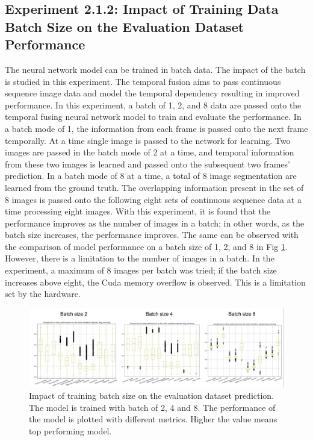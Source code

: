 	\subsection{Experiment 2.1.2: Impact of Training Data Batch Size on the Evaluation Dataset Performance}
	
	The neural network model can be trained in batch data. The impact of the batch is studied in this experiment. The temporal fusion aims to pass continuous sequence image data and model the temporal dependency resulting in improved performance. In this experiment, a batch of 1, 2, and 8 data are passed onto the temporal fusing neural network model to train and evaluate the performance. In a batch mode of 1, the information from each frame is passed onto the next frame temporally. At a time single image is passed to the network for learning. Two images are passed in the batch mode of 2 at a time, and temporal information from these two images is learned and passed onto the subsequent two frames' prediction. In a batch mode of 8 at a time, a total of 8 image segmentation are learned from the ground truth. The overlapping information present in the set of 8 images is passed onto the following eight sets of continuous sequence data at a time processing eight images. With this experiment, it is found that the performance improves as the number of images in a batch; in other words, as the batch size increases, the performance improves. The same can be observed with the comparison of model performance on a batch size of 1, 2, and 8 in Fig \ref{fig:batch_wise_performance}. However, there is a limitation to the number of images in a batch. In the experiment, a maximum of 8 images per batch was tried; if the batch size increases above eight, the Cuda memory overflow is observed. This is a limitation set by the hardware. 

	\begin{figure}
		\centering
		\includegraphics[width=16cm]{images/batch_wise_performance_comparison.png}
		\caption{Impact of training batch size on the evaluation dataset prediction. The model is trained with batch of 2, 4 and 8. The performance of the model is plotted with different metrics. Higher the value means top performing model.}
		\label{fig:batch_wise_performance}
	\end{figure}		    
	
